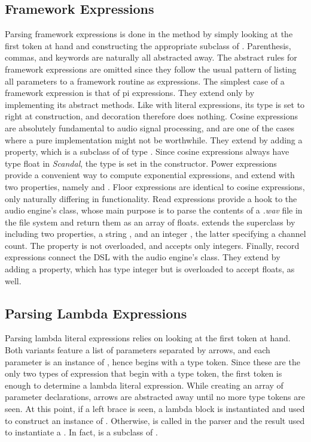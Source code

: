 \subsection{Framework Expressions}

Parsing framework expressions is done in the  method by simply looking at the first token at hand and constructing the appropriate subclass of . Parenthesis, commas, and keywords are naturally all abstracted away. The abstract rules for framework expressions are omitted since they follow the usual pattern of listing all parameters to a framework routine as expressions. The simplest case of a framework expression is that of pi expressions. They extend  only by implementing its abstract methods. Like with literal expressions, its type is set to  right at construction, and decoration therefore does nothing. Cosine expressions are absolutely fundamental to audio signal processing, and are one of the cases where a pure  implementation might not be worthwhile. They extend  by adding a  property, which is a subclass of  of type . Since cosine expressions always have type float in \emph{Scandal}, the type is set in the constructor. Power expressions provide a convenient way to compute exponential expressions, and extend  with two properties, namely  and . Floor expressions are identical to cosine expressions, only naturally differing in functionality. Read expressions provide a hook to the audio engine's  class, whose main purpose is to parse the contents of a \emph{.wav} file in the file system and return them as an array of floats.  extends the superclass by including two properties, a string , and an integer , the latter specifying a channel count. The  property is not overloaded, and accepts only integers. Finally, record expressions connect the DSL with the audio engine's  class. They extend  by adding a  property, which has type integer but is overloaded to accept floats, as well.

\subsection{Parsing Lambda Expressions}

Parsing lambda literal expressions relies on looking at the first token at hand. Both variants feature a list of parameters separated by arrows, and each parameter is an instance of , hence begins with a type token. Since these are the only two types of expression that begin with a type token, the first token is enough to determine a lambda literal expression. While creating an array of parameter declarations, arrows are abstracted away until no more type tokens are seen. At this point, if a left brace is seen, a lambda block is instantiated and used to construct an instance of . Otherwise,  is called in the parser and the result used to instantiate a . In fact,  is a subclass of .

